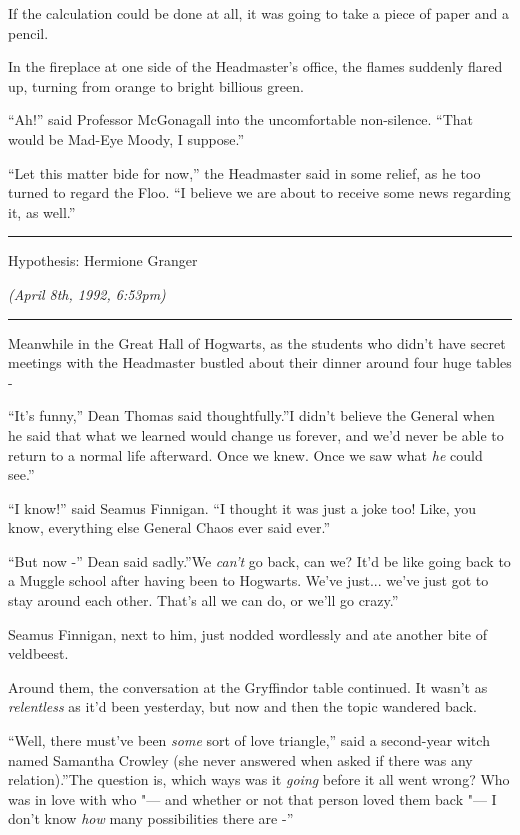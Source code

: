 If the calculation could be done at all, it was going to take a piece of
paper and a pencil.

In the fireplace at one side of the Headmaster's office, the flames
suddenly flared up, turning from orange to bright billious green.

``Ah!'' said Professor McGonagall into the uncomfortable non-silence.
``That would be Mad-Eye Moody, I suppose.''

``Let this matter bide for now,'' the Headmaster said in some relief, as
he too turned to regard the Floo. ``I believe we are about to receive
some news regarding it, as well.''

\begin{center}\rule{3in}{0.4pt}\end{center}

Hypothesis: Hermione Granger

\emph{(April 8th, 1992, 6:53pm)}

\begin{center}\rule{3in}{0.4pt}\end{center}

Meanwhile in the Great Hall of Hogwarts, as the students who didn't have
secret meetings with the Headmaster bustled about their dinner around
four huge tables -

``It's funny,'' Dean Thomas said thoughtfully.''I didn't believe the
General when he said that what we learned would change us forever, and
we'd never be able to return to a normal life afterward. Once we knew.
Once we saw what \emph{he} could see.''

``I know!'' said Seamus Finnigan. ``I thought it was just a joke too!
Like, you know, everything else General Chaos ever said ever.''

``But now -'' Dean said sadly.''We \emph{can't} go back, can we? It'd be
like going back to a Muggle school after having been to Hogwarts. We've
just... we've just got to stay around each other. That's all we can
do, or we'll go crazy.''

Seamus Finnigan, next to him, just nodded wordlessly and ate another
bite of veldbeest.

Around them, the conversation at the Gryffindor table continued. It
wasn't as \emph{relentless} as it'd been yesterday, but now and then the
topic wandered back.

``Well, there must've been \emph{some} sort of love triangle,'' said a
second-year witch named Samantha Crowley (she never answered when asked
if there was any relation).''The question is, which ways was it
\emph{going} before it all went wrong? Who was in love with who "--- and
whether or not that person loved them back "--- I don't know \emph{how}
many possibilities there are -''

